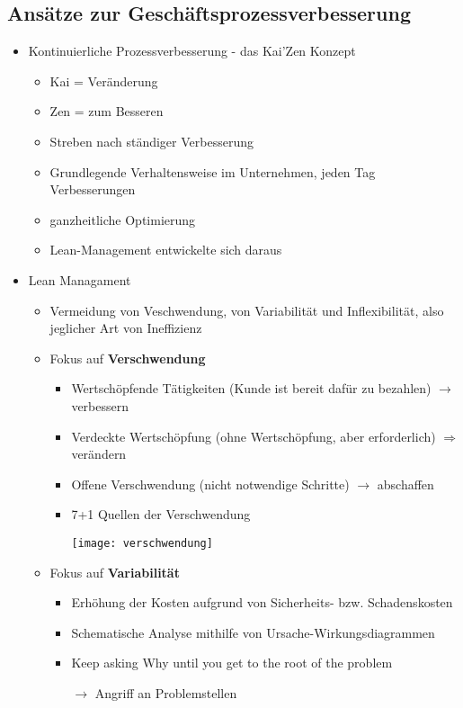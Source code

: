 \subsection{Ansätze zur Geschäftsprozessverbesserung}
\begin{itemize}
\item Kontinuierliche Prozessverbesserung - das Kai'Zen Konzept
	\begin{itemize}
	\item Kai = Veränderung
	\item Zen = zum Besseren
	\item Streben nach ständiger Verbesserung
	\item Grundlegende Verhaltensweise im Unternehmen, jeden Tag Verbesserungen
	\item ganzheitliche Optimierung
	\item Lean-Management entwickelte sich daraus
	\end{itemize}
	
\item Lean Managament
	\begin{itemize}
	\item Vermeidung von Veschwendung, von Variabilität und Inflexibilität, also jeglicher Art von Ineffizienz
	\item Fokus auf \textbf{Verschwendung}
		\begin{itemize}
		\item Wertschöpfende Tätigkeiten (Kunde ist bereit dafür zu bezahlen) $\rightarrow$ verbessern
		\item Verdeckte Wertschöpfung (ohne Wertschöpfung, aber erforderlich) $\Rightarrow$ verändern
		\item Offene Verschwendung (nicht notwendige Schritte) $\rightarrow$ abschaffen
		\item 7+1 Quellen der Verschwendung
		\vspace{0.3cm}
		\item[]	\texttt{[image: verschwendung]}				
		\end{itemize}
	
	\item Fokus auf \textbf{Variabilität}
		\begin{itemize}
		\item Erhöhung der Kosten aufgrund von Sicherheits- bzw. Schadenskosten
		\item Schematische Analyse mithilfe von Ursache-Wirkungsdiagrammen
		\item Keep asking Why until you get to the root of the problem
		\item[$\rightarrow$] Angriff an Problemstellen
		\end{itemize}
		

\end{itemize}
\end{itemize}
